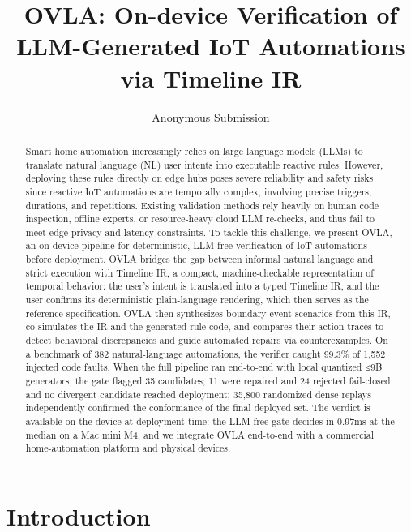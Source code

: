 \documentclass[sigconf,nonacm,anonymous,review]{acmart}
\title{OVLA: On-device Verification of LLM-Generated IoT Automations via Timeline IR}
\author{Anonymous Submission}
\affiliation{\institution{Submitted to SenSys 2027}\country{}}
\begin{document}
\begin{abstract}
Smart home automation increasingly relies on large language models (LLMs) to translate natural language (NL) user intents into executable reactive rules. However, deploying these rules directly on edge hubs poses severe reliability and safety risks since reactive IoT automations are temporally complex, involving precise triggers, durations, and repetitions. Existing validation methods rely heavily on human code inspection, offline experts, or resource-heavy cloud LLM re-checks, and thus fail to meet edge privacy and latency constraints. To tackle this challenge, we present OVLA, an on-device pipeline for deterministic, LLM-free verification of IoT automations before deployment. OVLA bridges the gap between informal natural language and strict execution with Timeline IR, a compact, machine-checkable representation of temporal behavior: the user's intent is translated into a typed Timeline IR, and the user confirms its deterministic plain-language rendering, which then serves as the reference specification. OVLA then synthesizes boundary-event scenarios from this IR, co-simulates the IR and the generated rule code, and compares their action traces to detect behavioral discrepancies and guide automated repairs via counterexamples. On a benchmark of 382 natural-language automations, the verifier caught 99.3\% of 1,552 injected code faults. When the full pipeline ran end-to-end with local quantized ≤9B generators, the gate flagged 35 candidates; 11 were repaired and 24 rejected fail-closed, and no divergent candidate reached deployment; 35,800 randomized dense replays independently confirmed the conformance of the final deployed set. The verdict is available on the device at deployment time: the LLM-free gate decides in 0.97ms at the median on a Mac mini M4, and we integrate OVLA end-to-end with a commercial home-automation platform and physical devices.
\end{abstract}



\maketitle

\section{Introduction}
\end{document}
